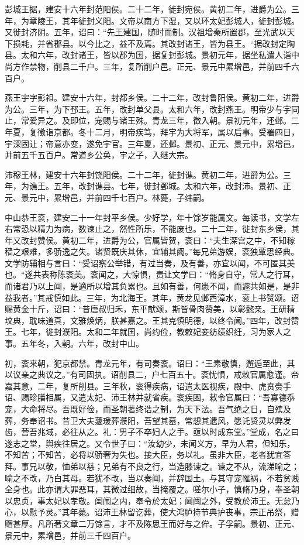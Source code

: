 \documentclass[12pt,UTF8]{ctexbook}
\begin{document}
彭城王据，建安十六年封范阳侯。二十二年，徙封宛侯。黄初二年，进爵为公。三年，为章陵王，其年徙封义阳。文帝以南方下湿，又以环太妃彭城人，徙封彭城。又徙封济阴。五年，诏曰：“先王建国，随时而制。汉祖增秦所置郡，至光武以天下损耗，并省郡县。以今比之，益不及焉。其改封诸王，皆为县王。“据改封定陶县。太和六年，改封诸王，皆以郡为国，据复封彭城。景初元年，据坐私遣人诣中尚方作禁物，削县二千户。三年，复所削户邑。正元、景元中累增邑，并前四千六百户。

燕王宇字彭祖。建安十六年，封都乡侯。二十二年，改封鲁阳侯。黄初二年，进爵为公。三年，为下邳王。五年，改封单父县。太和六年，改封燕王。明帝少与宇同止，常爱异之。及即位，宠赐与诸王殊。青龙三年，徵入朝。景初元年，还邺。二年夏，复徵诣京都。冬十二月，明帝疾笃，拜宇为大将军，属以后事。受署四日，宇深固让；帝意亦变，遂免宇官。三年夏，还邺。景初、正元、景元中，累增邑，并前五千五百户。常道乡公奂，宇之子，入继大宗。

沛穆王林，建安十六年封饶阳侯。二十二年，徙封谯。黄初二年，进爵为公。三年，为谯王。五年，改封谯县。七年，徙封鄄城。太和六年，改封沛。景初、正元、景元中，累增邑，并前四千七百户。林薨，子纬嗣。

中山恭王衮，建安二十一年封平乡侯。少好学，年十馀岁能属文。每读书，文学左右常恐以精力为病，数谏止之，然性所乐，不能废也。二十二年，徙封东乡侯，其年又改封赞侯。黄初二年，进爵为公，官属皆贺，衮曰：“夫生深宫之中，不知稼穑之艰难，多骄逸之失。诸贤既庆其休，宜辅其阙。”每兄弟游娱，衮独覃思经典。文学防辅相与言曰：“受诏察公举错，有过当奏，及有善，亦宜以闻，不可匿其美也。“遂共表称陈衮美。衮闻之，大惊惧，责让文学曰：“脩身自守，常人之行耳，而诸君乃以上闻，是適所以增其负累也。且如有善，何患不闻，而遽共如是，是非益我者。”其戒慎如此。三年，为北海王。其年，黄龙见邺西漳水，衮上书赞颂。诏赐黄金十斤，诏曰：“昔唐叔归禾，东平献颂，斯皆骨肉赞美，以彰懿亲。王研精坟典，耽味道真，文雅焕炳，朕甚嘉之。王其克慎明德，以终令闻。”四年，改封赞王。七年，徙封濮阳。太和二年就国，尚约俭，教敕妃妾纺绩织纴，习为家人之事。五年冬，入朝。六年，改封中山。

初，衮来朝，犯京都禁。青龙元年，有司奏衮。诏曰：“王素敬慎，邂逅至此，其以议亲之典议之。”有司固执。诏削县二，户七百五十。衮忧惧，戒敕官属愈谨。帝嘉其意，二年，复所削县。三年秋，衮得疾病，诏遣太医视疾，殿中、虎贲赍手诏、赐珍膳相属，又遣太妃、沛王林并就省疾。衮疾困，敕令官属曰：“吾寡德忝宠，大命将尽。吾既好俭，而圣朝著终诰之制，为天下法。吾气绝之日，自殡及葬，务奉诏书。昔卫大夫蘧瑗葬濮阳，吾望其墓，常想其遗风，愿讬贤灵以弊发齿，营吾兆域，必往从之。礼：男子不卒妇人之手。亟以时成东堂。”堂成，名之曰遂志之堂，舆疾往居之。又令世子曰：“汝幼少，未闻义方，早为人君，但知乐，不知苦；不知苦，必将以骄奢为失也。接大臣，务以礼。虽非大臣，老者犹宜答拜。事兄以敬，恤弟以慈；兄弟有不良之行，当造膝谏之。谏之不从，流涕喻之；喻之不改，乃白其母。若犹不改，当以奏闻，并辞国土。与其守宠罹祸，不若贫贱全身也。此亦谓大罪恶耳，其微过细故，当掩覆之。嗟尔小子，慎脩乃身，奉圣朝以忠贞，事太妃以孝敬。闺闱之内，奉令於太妃；阃阈之外，受教於沛王。无怠乃心，以慰予灵。”其年薨。诏沛王林留讫葬，使大鸿胪持节典护丧事，宗正吊祭，赠赗甚厚。凡所著文章二万馀言，才不及陈思王而好与之侔。子孚嗣。景初、正元、景元中，累增邑，并前三千四百户。
\end{document}
